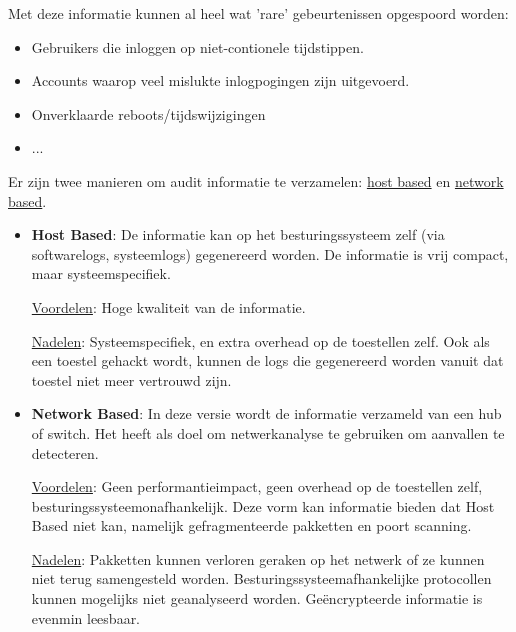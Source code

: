 \documentclass{report}
\begin{document}
	Met deze informatie kunnen al heel wat 'rare' gebeurtenissen opgespoord worden:
	\begin{itemize}
		\item Gebruikers die inloggen op niet-contionele tijdstippen.
		\item Accounts waarop veel mislukte inlogpogingen zijn uitgevoerd.
		\item Onverklaarde reboots/tijdswijzigingen
		\item ...
	\end{itemize}

	Er zijn twee manieren om audit informatie te verzamelen: \underline{host based} en \underline{network based}.
	\begin{itemize}
		\item \textbf{Host Based}: De informatie kan op het besturingssysteem zelf (via softwarelogs, systeemlogs) gegenereerd worden. De informatie is vrij compact, maar systeemspecifiek. 
		
		\underline{Voordelen}: Hoge kwaliteit van de informatie.

		\underline{Nadelen}: Systeemspecifiek, en extra overhead op de toestellen zelf. Ook als een toestel gehackt wordt, kunnen de logs die gegenereerd worden vanuit dat toestel niet meer vertrouwd zijn.

		\item \textbf{Network Based}: In deze versie wordt de informatie verzameld van een hub of switch. Het heeft als doel om netwerkanalyse te gebruiken om aanvallen te detecteren.
		
		\underline{Voordelen}: Geen performantieimpact, geen overhead op de toestellen zelf, besturingssysteemonafhankelijk. Deze vorm kan informatie bieden dat Host Based niet kan, namelijk gefragmenteerde pakketten en poort scanning.

		\underline{Nadelen}: Pakketten kunnen verloren geraken op het netwerk of ze kunnen niet terug samengesteld worden. Besturingssysteemafhankelijke protocollen kunnen mogelijks niet geanalyseerd worden. Geëncrypteerde informatie is evenmin leesbaar. 

	\end{itemize}
\end{document}
